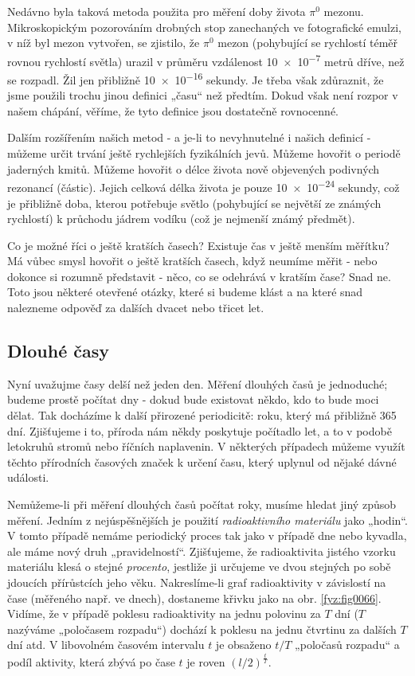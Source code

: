       Nedávno byla taková metoda použita pro měření doby života \(\pi^0\) mezonu. Mikroskopickým
      pozorováním drobných stop zanechaných ve fotografické emulzi, v níž byl mezon vytvořen, se
      zjistilo, že \(\pi^0\) mezon (pohybující se rychlostí téměř rovnou rychlostí světla) urazil v
      průměru vzdálenost \num{10e-7} metrů dříve, než se rozpadl. Žil jen přibližně \num{10e-16}
      sekundy. Je třeba však zdůraznit, že jsme použili trochu jinou definici „času“ než předtím.
      Dokud však není rozpor v našem chápání, věříme, že tyto definice jsou dostatečně rovnocenné.
      
      Dalším rozšířením našich metod - a je-li to nevyhnutelné i našich definicí - můžeme určit
      trvání ještě rychlejších fyzikálních jevů. Můžeme hovořit o periodě jaderných kmitů. Můžeme
      hovořit o délce života nově objevených podivných rezonancí (částic). Jejich celková délka
      života je pouze \num{10e-24} sekundy, což je přibližně doba, kterou potřebuje světlo
      (pohybující se největší ze známých rychlostí) k průchodu jádrem vodíku (což je nejmenší známý
      předmět).
      
      Co je možné říci o ještě kratších časech? Existuje čas v ještě menším měřítku? Má vůbec smysl
      hovořit o ještě kratších časech, když neumíme měřit - nebo dokonce si rozumně představit -
      něco, co se odehrává v kratším čase? Snad ne. Toto jsou některé otevřené otázky, které si
      budeme klást a na které snad nalezneme odpověď za dalších dvacet nebo třicet let.
    
    \subsection{Dlouhé časy}
      Nyní uvažujme časy delší než jeden den. Měření dlouhých časů je jednoduché; budeme prostě
      počítat dny - dokud bude existovat někdo, kdo to bude moci dělat. Tak docházíme k další
      přirozené periodicitě: roku, který má přibližně \num{365} dní. Zjišťujeme i to, příroda nám
      někdy poskytuje počítadlo let, a to v podobě letokruhů stromů nebo říčních naplavenin. V
      některých případech můžeme využít těchto přírodních časových značek k určení času, který
      uplynul od nějaké dávné události.
      
      Nemůžeme-li při měření dlouhých časů počítat roky, musíme hledat jiný způsob měření. Jedním z
      nejúspěšnějších je použití \emph{radioaktivního materiálu} jako „hodin“. V tomto případě
      nemáme periodický proces tak jako v případě dne nebo kyvadla, ale máme nový druh
      „pravidelností“. Zjišťujeme, že radioaktivita jistého vzorku materiálu klesá o stejné
      \emph{procento},    
      jestliže ji určujeme ve dvou stejných po sobě jdoucích přírůstcích jeho věku. Nakreslíme-li
      graf radioaktivity v závislostí na čase (měřeného např. ve dnech), dostaneme křivku jako na
      obr. \ref{fyz:fig0066}. Vidíme, že v případě poklesu radioaktivity na jednu polovinu za \(T\)
      dní (\(T\) nazýváme „poločasem rozpadu“) dochází k poklesu na jednu čtvrtinu za dalších \(T\)
      dní atd. V libovolném časovém intervalu \(t\) je obsaženo \(t/T\) „poločasů rozpadu“ a podíl
      aktivity, která zbývá po čase \(t\) je roven \((l/2)^{\frac{t}{T}}\).

